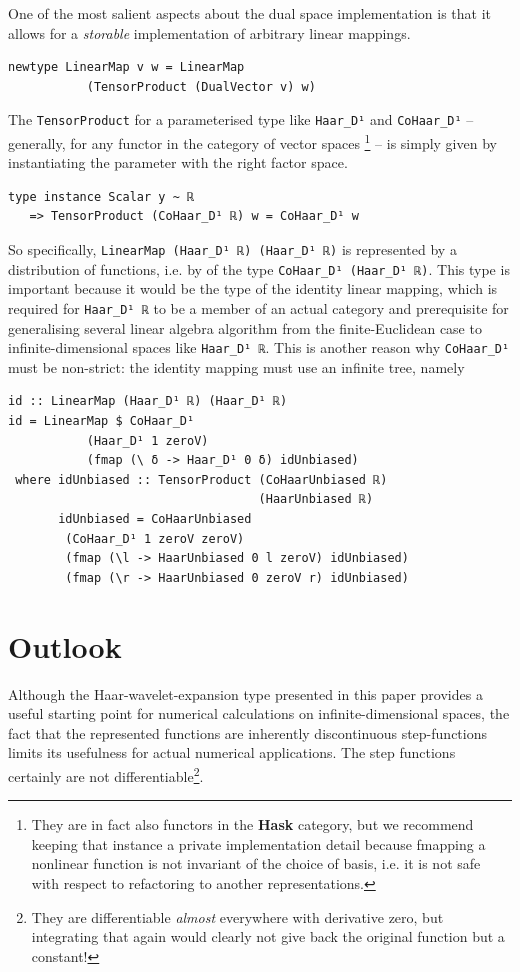 \documentclass[sigplan,screen]{acmart}
\theoremstyle{acmplain}
\theoremstyle{acmdefinition}
\begin{document}
One of the most salient aspects about the dual space implementation is that it allows for a \emph{storable} implementation of arbitrary linear mappings.
\begin{lstlisting}
newtype LinearMap v w = LinearMap
           (TensorProduct (DualVector v) w)
\end{lstlisting}
The \lstinline`TensorProduct` for a parameterised type like \lstinline`Haar_D¹` and \lstinline`CoHaar_D¹` -- generally, for any functor in the category of vector spaces%
\footnote{They are in fact also functors in the \textbf{Hask} category, but we recommend keeping that instance a private implementation detail because fmapping a nonlinear function is not invariant of the choice of basis, i.e. it is not safe with respect to refactoring to another representations.
} -- is simply given by instantiating the parameter with the right factor space.
\begin{lstlisting}
type instance Scalar y ~ ℝ
   => TensorProduct (CoHaar_D¹ ℝ) w = CoHaar_D¹ w
\end{lstlisting}
So specifically, \lstinline`LinearMap (Haar_D¹ ℝ) (Haar_D¹ ℝ)` is represented by a distribution of functions, i.e. by of the type \lstinline`CoHaar_D¹ (Haar_D¹ ℝ)`.
This type is important because it would be the type of the identity linear mapping, which is required for \lstinline`Haar_D¹ ℝ` to be a member of an actual category and prerequisite for generalising several linear algebra algorithm from the finite-Euclidean case to infinite-dimensional spaces like \lstinline`Haar_D¹ ℝ`.
This is another reason why \lstinline`CoHaar_D¹` must be non-strict: the identity mapping must use an infinite tree, namely
\begin{lstlisting}
id :: LinearMap (Haar_D¹ ℝ) (Haar_D¹ ℝ)
id = LinearMap $ CoHaar_D¹
           (Haar_D¹ 1 zeroV)
           (fmap (\ δ -> Haar_D¹ 0 δ) idUnbiased)
 where idUnbiased :: TensorProduct (CoHaarUnbiased ℝ)
                                   (HaarUnbiased ℝ)
       idUnbiased = CoHaarUnbiased
        (CoHaar_D¹ 1 zeroV zeroV)
        (fmap (\l -> HaarUnbiased 0 l zeroV) idUnbiased)
        (fmap (\r -> HaarUnbiased 0 zeroV r) idUnbiased)
\end{lstlisting}

\section{Outlook}
Although the Haar-wavelet-expansion type presented in this paper provides a useful starting point for numerical calculations on infinite-dimensional spaces, the fact that the represented functions are inherently discontinuous step-functions limits its usefulness for actual numerical applications. The step functions certainly are not differentiable\footnote{%
They are differentiable \emph{almost} everywhere with derivative zero, but integrating that again would clearly not give back the original function but a constant!}.
\end{document}
